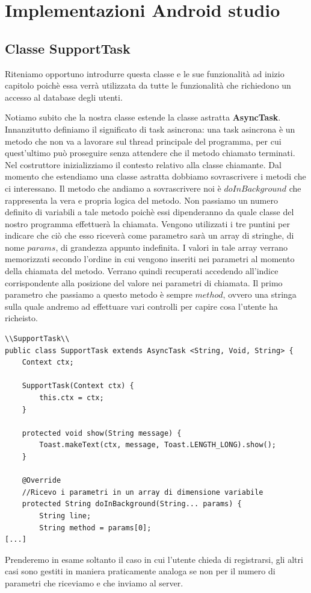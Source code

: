 \documentclass[a4paper, 50pt, twoside]{article}
\begin{document}
\section{Implementazioni Android studio}
\subsection{Classe SupportTask}
Riteniamo opportuno introdurre questa classe e le sue funzionalità ad inizio capitolo poichè essa verrà utilizzata da tutte le funzionalità che richiedono un accesso al database degli utenti. 

Notiamo subito che la nostra classe estende la classe astratta \textbf{AsyncTask}. Innanzitutto definiamo il significato di task asincrona: una task asincrona è un metodo che non va a lavorare sul thread principale del programma, per cui quest'ultimo può proseguire senza attendere che il metodo chiamato terminati. Nel costruttore inizializziamo il contesto relativo alla classe chiamante. Dal momento che estendiamo una classe astratta dobbiamo sovrascrivere i metodi che ci interessano. Il metodo che andiamo a sovrascrivere noi è $doInBackground$ che rappresenta la vera e propria logica del metodo. Non passiamo un numero definito di variabili a tale metodo poichè essi dipenderanno da quale classe del nostro programma effettuerà la chiamata. Vengono utilizzati i tre puntini per indicare che ciò che esso riceverà come parametro sarà un array di stringhe, di nome $params$, di grandezza appunto indefinita. I valori in tale array verrano memorizzati secondo l'ordine in cui vengono inseriti nei parametri al momento della chiamata del metodo. Verrano quindi recuperati accedendo all'indice corrispondente alla posizione del valore nei parametri di chiamata. Il primo parametro che passiamo a questo metodo è sempre $method$, ovvero una stringa sulla quale andremo ad effettuare vari controlli per capire cosa l'utente ha richeisto. 
\begin{lstlisting}
\\SupportTask\\
public class SupportTask extends AsyncTask <String, Void, String> {
    Context ctx;

    SupportTask(Context ctx) {
        this.ctx = ctx;
    }

    protected void show(String message) {
        Toast.makeText(ctx, message, Toast.LENGTH_LONG).show();
    }

    @Override
    //Ricevo i parametri in un array di dimensione variabile
    protected String doInBackground(String... params) {
        String line;
        String method = params[0];
[...]
\end{lstlisting}
Prenderemo in esame soltanto il caso in cui l'utente chieda di registrarsi, gli altri casi sono gestiti in maniera praticamente analoga se non per il numero di parametri che riceviamo e che inviamo al server. 
\end{document}
